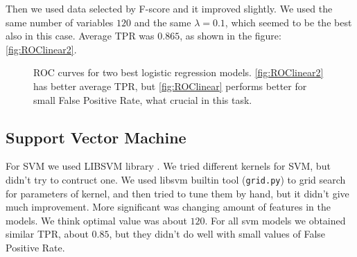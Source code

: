 \documentclass[]{report}
\begin{document}
Then we used data selected by F-score and it improved slightly. We used the same number of variables $120$ and the same $\lambda = 0.1$, which seemed to be the best also in this case. Average TPR was $0.865$, as shown in the figure: \ref{fig:ROClinear2}.
  \begin{figure}[h]
    \center
    \caption{ROC curves for two best logistic regression models. \ref{fig:ROClinear2} has better average TPR, but \ref{fig:ROClinear} performs better for small False Positive Rate, what crucial in this task.}
  \end{figure}

\subsection{Support Vector Machine}
For SVM we used LIBSVM library \cite{libsvm}.
We tried different kernels for SVM, but didn't try to contruct  one. We used libsvm builtin tool (\texttt{grid.py}) to grid search for parameters of kernel, and then tried to tune them by hand, but it didn't give much improvement. More significant was changing amount of features in the models. We think optimal value was about $120$. For all svm models we obtained similar TPR, about $0.85$, but they didn't do well with small values of False Positive Rate.
\end{document}
